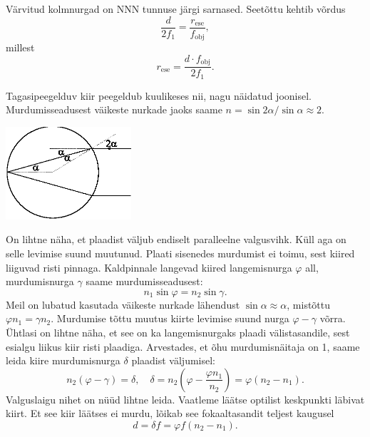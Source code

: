 \documentclass[10pt, twoside]{article}
\begin{document}
{Värvitud kolmnurgad on NNN tunnuse järgi sarnased. Seetõttu kehtib võrdus
\[
\frac{d}{2f_1}=\frac{r_{\mathrm{ese}}}{f_{\mathrm{obj}}},
\]
millest
\[
r_{\mathrm{ese}}=\frac{d\cdot f_{\mathrm{obj}}}{2f_1}.
\]
\probend
\bigskip


\solu
Tagasipeegelduv kiir peegeldub kuulikeses nii, nagu näidatud joonisel. Murdumisseadusest väikeste nurkade jaoks saame
$n=\sin 2\alpha/\sin\alpha \approx 2.$
\begin{center}
	\includegraphics[width=0.35\textwidth]{2010-lahg-04-kuulike.eps}
\end{center}
\probend
\bigskip


\solu
On lihtne näha, et plaadist väljub endiselt paralleelne valgusvihk. Küll aga on selle levimise suund muutunud. Plaati sisenedes murdumist ei toimu, sest kiired liiguvad risti pinnaga. Kaldpinnale langevad kiired langemisnurga $\varphi$ all, murdumisnurga $\gamma$ saame murdumisseadusest:
\[
n_1 \sin \varphi = n_2 \sin \gamma.
\]
Meil on lubatud kasutada väikeste nurkade lähendust $\sin \alpha \approx \alpha$, mistõttu $\varphi n_1 = \gamma n_2$. Murdumise tõttu muutus kiirte levimise suund nurga $\varphi -\gamma$ võrra. Ühtlasi on lihtne näha, et see on ka langemisnurgaks plaadi välistasandile, sest esialgu liikus kiir risti plaadiga. Arvestades, et õhu murdumisnäitaja on 1, saame leida kiire murdumisnurga $\delta$ plaadist väljumisel:
\[
n_{2}(\varphi-\gamma)=\delta, \quad \delta=n_{2}\left(\varphi-\frac{\varphi n_{1}}{n_{2}}\right)=\varphi\left(n_{2}-n_{1}\right).
\]
Valguslaigu nihet on nüüd lihtne leida. Vaatleme läätse optilist keskpunkti
läbivat kiirt. Et see kiir läätses ei murdu, lõikab see fokaaltasandit teljest kaugusel
\[
d = \delta f = \varphi f (n_2 - n_1).
\]
\probend
\bigskip


}
\end{document}
